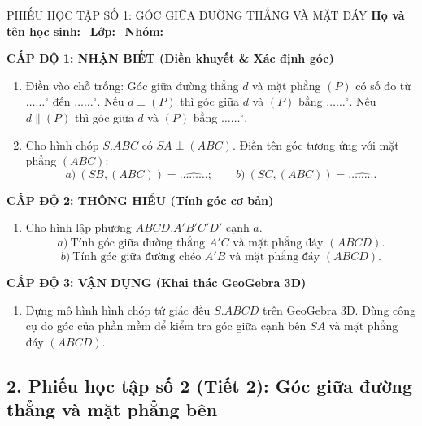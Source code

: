 \documentclass[12pt, a4paper]{article}
\begin{document}
\begin{pedabox}{PHIẾU HỌC TẬP SỐ 1: GÓC GIỮA ĐƯỜNG THẲNG VÀ MẶT ĐÁY}
\textbf{Họ và tên học sinh:} \dotfill \ \textbf{Lớp:} \dotfill \ \textbf{Nhóm:} \dotfill

\noindent \textbf{CẤP ĐỘ 1: NHẬN BIẾT (Điền khuyết \& Xác định góc)}
\begin{enumerate}[leftmargin=0.6cm]
    \item Điền vào chỗ trống:
    Góc giữa đường thẳng $d$ và mặt phẳng $(P)$ có số đo từ $\dots\dots^\circ$ đến $\dots\dots^\circ$.
    Nếu $d \perp (P)$ thì góc giữa $d$ và $(P)$ bằng $\dots\dots^\circ$.
    Nếu $d \parallel (P)$ thì góc giữa $d$ và $(P)$ bằng $\dots\dots^\circ$.
    \item Cho hình chóp $S.ABC$ có $SA \perp (ABC)$. Điền tên góc tương ứng với mặt phẳng $(ABC)$:
    $$a) \ (SB, (ABC)) = \widehat{\dots\dots\dots}; \qquad b) \ (SC, (ABC)) = \widehat{\dots\dots\dots}$$
\end{enumerate}

\noindent \textbf{CẤP ĐỘ 2: THÔNG HIỂU (Tính góc cơ bản)}
\begin{enumerate}[leftmargin=0.6cm]
    \item Cho hình lập phương $ABCD.A'B'C'D'$ cạnh $a$.
    $$a) \ \text{Tính góc giữa đường thẳng } A'C \text{ và mặt phẳng đáy } (ABCD).$$
    $$b) \ \text{Tính góc giữa đường chéo } A'B \text{ và mặt phẳng đáy } (ABCD).$$
\end{enumerate}

\noindent \textbf{CẤP ĐỘ 3: VẬN DỤNG (Khai thác GeoGebra 3D)}
\begin{enumerate}[leftmargin=0.6cm]
    \item Dựng mô hình hình chóp tứ giác đều $S.ABCD$ trên GeoGebra 3D. Dùng công cụ đo góc của phần mềm để kiểm tra góc giữa cạnh bên $SA$ và mặt phẳng đáy $(ABCD)$.
\end{enumerate}
\end{pedabox}

\subsection*{2. Phiếu học tập số 2 (Tiết 2): Góc giữa đường thẳng và mặt phẳng bên}
\end{document}
